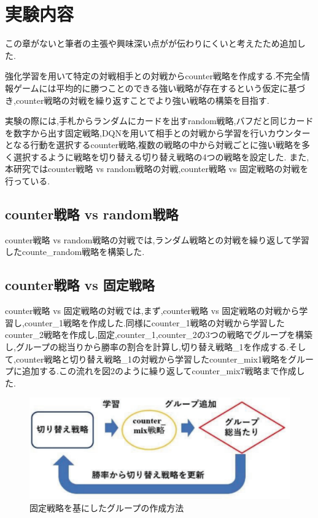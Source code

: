 \documentclass{jarticle}     %
\begin{document}
\section*{実験内容}
この章がないと筆者の主張や興味深い点がが伝わりにくいと考えたため追加した.\par
強化学習を用いて特定の対戦相手との対戦からcounter戦略を作成する.不完全情報ゲームには平均的に勝つことのできる強い戦略が存在するという仮定に基づき,counter戦略の対戦を繰り返すことでより強い戦略の構築を目指す.\par
実験の際には,手札からランダムにカードを出すrandom戦略,バフだと同じカードを数字から出す固定戦略,DQNを用いて相手との対戦から学習を行いカウンターとなる行動を選択するcounter戦略,複数の戦略の中から対戦ごとに強い戦略を多く選択するように戦略を切り替える切り替え戦略の4つの戦略を設定した.
また,本研究ではcounter戦略 vs random戦略の対戦,counter戦略 vs 固定戦略の対戦を行っている.\par

\subsection*{counter戦略 vs random戦略}
counter戦略 vs random戦略の対戦では,ランダム戦略との対戦を繰り返して学習したcounte\_random戦略を構築した.

\subsection*{counter戦略 vs 固定戦略}
counter戦略 vs 固定戦略の対戦では,まず,counter戦略 vs 固定戦略の対戦から学習し,counter\_1戦略を作成した.同様にcounter\_1戦略の対戦から学習したcounter\_2戦略を作成し,固定,counter\_1,counter\_2の3つの戦略でグループを構築し,グループの総当りから勝率の割合を計算し,切り替え戦略\_1を作成する.そして,counter戦略と切り替え戦略\_1の対戦から学習したcounter\_mix1戦略をグループに追加する.この流れを図2のように繰り返してcounter\_mix7戦略まで作成した.

\begin{figure}[ht]
  \centering
  \includegraphics[width=120mm]{assets/Figure2.eps}
  \caption{固定戦略を基にしたグループの作成方法}
  \label{fig:How to nake grouping}
\end{figure}
\end{document}
